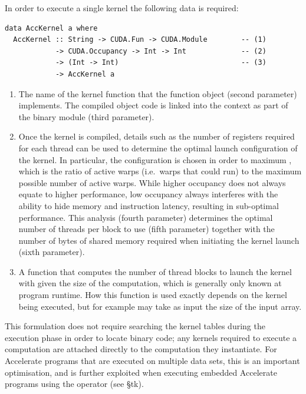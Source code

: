 In order to execute a single kernel the following data is required:
%
\begin{lstlisting}[style=haskell]
data AccKernel a where
  AccKernel :: String -> CUDA.Fun -> CUDA.Module        -- (1)
            -> CUDA.Occupancy -> Int -> Int             -- (2)
            -> (Int -> Int)                             -- (3)
            -> AccKernel a
\end{lstlisting}
%
\begin{enumerate}
\item The name of the  kernel function that the function
    object (second parameter) implements. The compiled object code is linked
    into the \CUDA context as part of the binary module (third parameter).

\item Once the kernel is compiled, details such as the number of registers
    required for each thread can be used to determine the optimal launch
    configuration of the kernel. In particular, the configuration is chosen in
    order to maximum , which is the ratio of active
    warps (i.e.\ warps that could run) to the maximum possible number of active
    warps. While higher occupancy does not always equate to higher performance,
    low occupancy always interferes with the ability to hide memory and
    instruction latency, resulting in sub-optimal performance. This analysis
    (fourth parameter) determines the optimal number of threads per block to use
    (fifth parameter) together with the number of bytes of shared memory
    required when initiating the kernel launch (sixth parameter).

\item A function that computes the number of thread blocks to launch the kernel
    with given the size of the computation, which is generally only known at
    program runtime. How this function is used exactly depends on the kernel
    being executed, but for example may take as input the size of the input
    array.
\end{enumerate}

This formulation does not require searching the kernel tables during the
execution phase in order to locate binary code; any kernels required to execute
a computation are attached directly to the computation they instantiate. For
Accelerate programs that are executed on multiple data sets, this is an
important optimisation, and is further exploited when executing embedded
Accelerate programs using the  operator (see \S tk).

